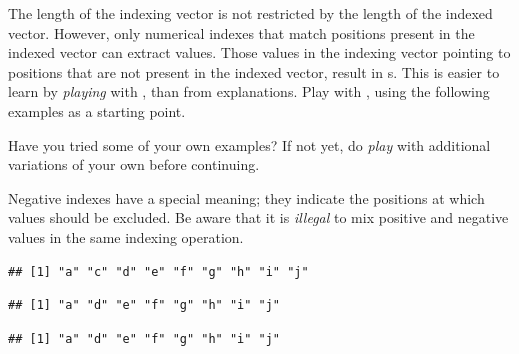 \documentclass[krantz2]{krantz}\usepackage{knitr}
\begin{document}
\begin{playground}
The length of the indexing vector is not restricted by the length of the indexed vector. However, only numerical indexes that match positions present in the indexed vector can extract values. Those values in the indexing vector pointing to positions that are not present in the indexed vector, result in s. This is easier to learn by \emph{playing} with \Rlang, than from explanations. Play with \Rlang, using the following examples as a starting point.

\begin{knitrout}\footnotesize
{}\color{fgcolor}\begin{kframe}
\begin{alltt}
\hlstd{a[}\hlstd{(}\hlstd{,} \hlstd{,} \hlstd{,} \hlstd{)]}
\hlstd{a[}\hlstd{(}\hlopt{:}\hlstd{,} \hlopt{:}\hlstd{)]}
\hlstd{a[}\hlstd{(}\hlstd{,} \hlstd{)]}
\hlstd{a[}\hlstd{]}
\end{alltt}
\end{kframe}
\end{knitrout}

Have you tried some of your own examples? If not yet, do \emph{play} with additional variations of your own before continuing.

\end{playground}

Negative indexes have a special meaning; they indicate the positions at which values should be excluded. Be aware that it is \emph{illegal} to mix positive and negative values in the same indexing operation.

\begin{knitrout}\footnotesize
{}\color{fgcolor}\begin{kframe}
\begin{alltt}
\hlstd{a[}\hlopt{-}\hlstd{]}
\end{alltt}
\begin{verbatim}
## [1] "a" "c" "d" "e" "f" "g" "h" "i" "j"
\end{verbatim}
\begin{alltt}
\hlstd{a[}\hlopt{-}\hlstd{(}\hlstd{,}\hlstd{)]}
\end{alltt}
\begin{verbatim}
## [1] "a" "d" "e" "f" "g" "h" "i" "j"
\end{verbatim}
\begin{alltt}
\hlstd{a[}\hlopt{-}\hlopt{:-}\hlstd{]}
\end{alltt}
\begin{verbatim}
## [1] "a" "d" "e" "f" "g" "h" "i" "j"
\end{verbatim}
\end{kframe}
\end{knitrout}
\end{document}
